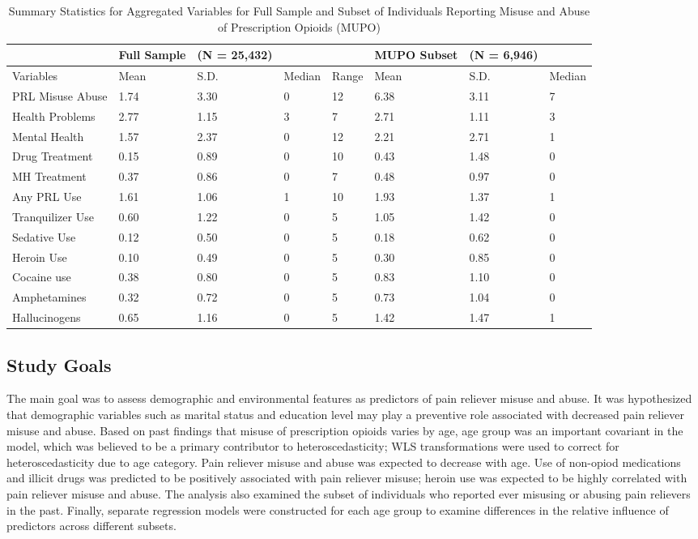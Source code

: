 \documentclass[sigconf]{acmart}
\begin{document}
\begin{table*}[ht]
  \caption{Summary Statistics for Aggregated Variables for Full Sample and 
  Subset of Individuals Reporting Misuse and Abuse of Prescription Opioids (MUPO)}
  \label{tab:freq}
  \begin{tabular}{llllllll}
    \toprule
     & Full Sample& (N = 25,432)&&& MUPO Subset& (N = 6,946)&  \\
    \midrule
    Variables & Mean& S.D.& Median& Range& Mean& S.D.& Median  \\
    \midrule
    PRL Misuse Abuse& 1.74& 3.30& 0& 12& 6.38& 3.11 & 7 \\
    Health Problems& 2.77& 1.15& 3& 7& 2.71& 1.11& 3  \\
    Mental Health& 1.57& 2.37& 0& 12& 2.21& 2.71& 1  \\
    Drug Treatment& 0.15& 0.89& 0& 10& 0.43& 1.48& 0  \\
    MH Treatment& 0.37& 0.86& 0& 7& 0.48& 0.97& 0  \\
    Any PRL Use& 1.61& 1.06& 1& 10& 1.93& 1.37& 1 \\
    Tranquilizer Use& 0.60& 1.22& 0& 5& 1.05& 1.42& 0  \\
    Sedative Use& 0.12& 0.50& 0& 5& 0.18& 0.62& 0  \\
    Heroin Use& 0.10& 0.49& 0& 5& 0.30& 0.85& 0  \\
    Cocaine use& 0.38& 0.80& 0& 5& 0.83& 1.10& 0 \\
    Amphetamines& 0.32& 0.72& 0& 5& 0.73& 1.04& 0  \\
    Hallucinogens& 0.65& 1.16& 0& 5& 1.42& 1.47& 1  \\
    \bottomrule
  \end{tabular}
\end{table*}

\subsection{Study Goals} 

The main goal was to assess demographic and environmental features as 
predictors of pain reliever misuse and abuse. It was hypothesized that 
demographic variables such as marital status and education level may play a 
preventive role associated with decreased pain reliever misuse and abuse. 
Based on past findings that misuse of prescription opioids varies by age, 
age group was an important covariant in the model, which was believed to be a
primary contributor to heteroscedasticity; WLS transformations were used to 
correct for heteroscedasticity due to age category. Pain reliever misuse and 
abuse was expected to decrease with age. Use of non-opiod medications and 
illicit drugs was predicted to be positively associated with pain reliever 
misuse; heroin use was expected to be highly correlated with pain reliever 
misuse and abuse. The analysis also examined the subset of individuals who 
reported ever misusing or abusing pain relievers in the past. Finally, 
separate regression models were constructed for each age group to examine 
differences in the relative influence of predictors across different subsets. 
\end{document}

